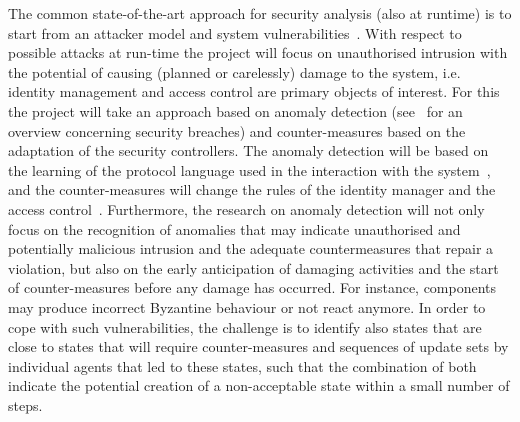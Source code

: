 \documentclass[a4paper,11pt]{article}
\newcommand{\project}[1]{\textbf{#1}\xspace}
\newcommand{\SECURITY}{\project{Elysian}}
\newcommand{\TheProject}{\SECURITY}
\begin{document}
The common state-of-the-art approach for security analysis (also at runtime) is to start from an attacker model and system vulnerabilities~\cite{Biskup09}. With respect to possible attacks at run-time the project will focus on unauthorised intrusion with the potential of causing (planned or carelessly) damage to the system, i.e. identity management and access control are primary objects of interest. For this the project will take an approach based on anomaly detection (see~\cite{BaileyCL14} for an overview concerning security breaches) and counter-measures based on the adaptation of the security controllers. The anomaly detection will be based on the learning of the protocol language used in the interaction with the system~\cite{Lampesberger13}, and the counter-measures will change the rules of the identity manager and the access control~\cite{BaileyCL14}. Furthermore, the research on anomaly detection will not only focus on the recognition of anomalies that may indicate unauthorised and potentially malicious intrusion and the adequate countermeasures that repair a violation, but also on the early anticipation of damaging activities and the start of counter-measures before any damage has occurred. For instance, components may produce incorrect Byzantine behaviour or not react anymore. In order to cope with such vulnerabilities, the challenge is to identify also states that are close to states that will require counter-measures and sequences of update sets by individual agents that led to these states, such that the combination of both indicate the potential creation of a non-acceptable state within a small number of steps. 

\end{document}
